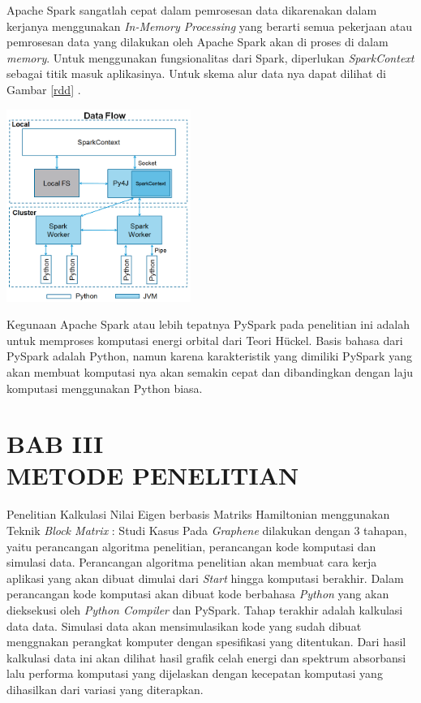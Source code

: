 \documentclass[12pt,a4paper]{report}
\begin{document}
	Apache Spark sangatlah cepat dalam pemrosesan data dikarenakan dalam kerjanya menggunakan \textit{In-Memory Processing} yang berarti semua pekerjaan atau pemrosesan data yang dilakukan oleh Apache Spark akan di proses di dalam \textit{memory}\cite{Bekker2017}. Untuk menggunakan fungsionalitas dari Spark, diperlukan \textit{SparkContext} sebagai titik masuk aplikasinya. Untuk skema alur data nya dapat dilihat di Gambar \ref{rdd} \cite{Tutorialspoint}.
	\begin{center}
		\includegraphics[width=6cm]{gambar/sparkcontext.png}
	\end{center}

	Kegunaan Apache Spark atau lebih tepatnya PySpark pada penelitian ini adalah untuk memproses komputasi energi orbital dari Teori Hückel. Basis bahasa dari PySpark adalah Python, namun karena karakteristik yang dimiliki PySpark yang akan membuat komputasi nya akan semakin cepat dan dibandingkan dengan laju komputasi menggunakan Python biasa.
	
\chapter*{BAB III \\ METODE PENELITIAN}
\setcounter{chapter}{3}
\setcounter{section}{0}
\setcounter{figure}{0}
\setcounter{equation}{0}
\thispagestyle{myplain}

Penelitian Kalkulasi Nilai Eigen berbasis Matriks Hamiltonian menggunakan Teknik \textit{Block Matrix} : Studi Kasus Pada \textit{Graphene} dilakukan dengan 3 tahapan, yaitu perancangan algoritma penelitian, perancangan kode komputasi dan simulasi data. Perancangan algoritma penelitian akan membuat cara kerja aplikasi yang akan dibuat dimulai dari \textit{Start} hingga komputasi berakhir. Dalam perancangan kode komputasi akan dibuat kode berbahasa \textit{Python} yang akan dieksekusi oleh \textit{Python Compiler} dan PySpark. Tahap terakhir adalah kalkulasi data data. Simulasi data akan mensimulasikan kode yang sudah dibuat menggnakan perangkat komputer dengan spesifikasi yang ditentukan. Dari hasil kalkulasi data ini akan dilihat hasil grafik celah energi dan spektrum absorbansi lalu performa komputasi yang dijelaskan dengan kecepatan komputasi yang dihasilkan dari variasi yang diterapkan.
\end{document}
